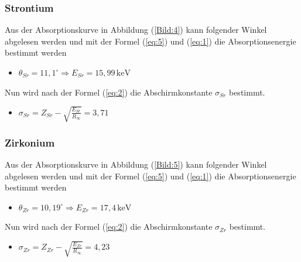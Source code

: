 \subsubsection{Strontium}
Aus der Absorptionskurve in Abbildung (\ref{Bild:4}) kann folgender Winkel abgelesen werden und mit der Formel (\ref{eq:5}) und (\ref{eq:1}) die
Absorptionsenergie bestimmt werden
\begin{itemize}
  \item $\theta_{Sr} = 11,1^\circ \Rightarrow E_{Sr} = 15,99 \,\text{keV}$
\end{itemize}
Nun wird nach der Formel (\ref{eq:2}) die Abschirmkonstante $\sigma_{Sr}$ bestimmt.
\begin{itemize}
  \item $\sigma_{Sr} = Z_{Sr} - \sqrt{\frac{E_{Sr}}{R_\infty}} = 3,71$
\end{itemize}
\subsubsection{Zirkonium}
Aus der Absorptionskurve in Abbildung (\ref{Bild:5}) kann folgender Winkel abgelesen werden und mit der Formel (\ref{eq:5}) und (\ref{eq:1}) die
Absorptionsenergie bestimmt werden
\begin{itemize}
  \item $\theta_{Zr} = 10,19^\circ \Rightarrow E_{Zr} = 17,4 \, \text{keV}$
\end{itemize}
Nun wird nach der Formel (\ref{eq:2}) die Abschirmkonstante $\sigma_{Zr}$ bestimmt.
\begin{itemize}
  \item $\sigma_{Zr} = Z_{Zr} - \sqrt{\frac{E_{Zr}}{R_\infty}} = 4,23$
\end{itemize}


